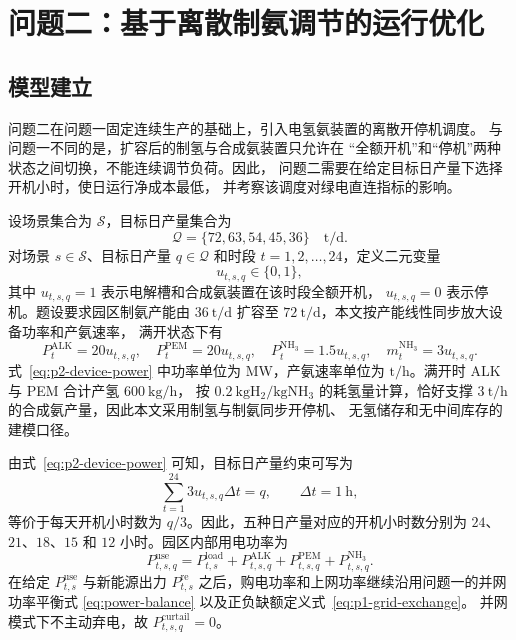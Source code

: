 \section{问题二：基于离散制氨调节的运行优化}

\subsection{模型建立}

问题二在问题一固定连续生产的基础上，引入电氢氨装置的离散开停机调度。
与问题一不同的是，扩容后的制氢与合成氨装置只允许在
``全额开机''和``停机''两种状态之间切换，不能连续调节负荷。因此，
问题二需要在给定目标日产量下选择开机小时，使日运行净成本最低，
并考察该调度对绿电直连指标的影响。

设场景集合为 $\mathcal{S}$，目标日产量集合为
\begin{equation}
  \mathcal{Q}=\{72,63,54,45,36\}\quad \mathrm{t/d}.
  \label{eq:p2-production-set}
\end{equation}
对场景 $s\in\mathcal{S}$、目标日产量 $q\in\mathcal{Q}$ 和时段
$t=1,2,\dots,24$，定义二元变量
\begin{equation}
  u_{t,s,q}\in\{0,1\},
  \label{eq:p2-binary}
\end{equation}
其中 $u_{t,s,q}=1$ 表示电解槽和合成氨装置在该时段全额开机，
$u_{t,s,q}=0$ 表示停机。题设要求园区制氨产能由 $36~\mathrm{t/d}$
扩容至 $72~\mathrm{t/d}$，本文按产能线性同步放大设备功率和产氨速率，
满开状态下有
\begin{equation}
  P_t^{\mathrm{ALK}}=20u_{t,s,q},\quad
  P_t^{\mathrm{PEM}}=20u_{t,s,q},\quad
  P_t^{\mathrm{NH_3}}=1.5u_{t,s,q},\quad
  m_t^{\mathrm{NH_3}}=3u_{t,s,q}.
  \label{eq:p2-device-power}
\end{equation}
式~\eqref{eq:p2-device-power} 中功率单位为 MW，产氨速率单位为
$\mathrm{t/h}$。满开时 ALK 与 PEM 合计产氢 $600~\mathrm{kg/h}$，
按 $0.2~\mathrm{kgH_2/kgNH_3}$ 的耗氢量计算，恰好支撑
$3~\mathrm{t/h}$ 的合成氨产量，因此本文采用制氢与制氨同步开停机、
无氢储存和无中间库存的建模口径。

由式~\eqref{eq:p2-device-power} 可知，目标日产量约束可写为
\begin{equation}
  \sum_{t=1}^{24} 3u_{t,s,q}\Delta t=q,
  \qquad \Delta t=1~\mathrm{h},
  \label{eq:p2-production-constraint}
\end{equation}
等价于每天开机小时数为 $q/3$。因此，五种日产量对应的开机小时数分别为
$24$、$21$、$18$、$15$ 和 $12$ 小时。园区内部用电功率为
\begin{equation}
  P_{t,s,q}^{\mathrm{use}}
  =P_{t,s}^{\mathrm{load}}
  +P_{t,s,q}^{\mathrm{ALK}}
  +P_{t,s,q}^{\mathrm{PEM}}
  +P_{t,s,q}^{\mathrm{NH_3}}.
  \label{eq:p2-use-power}
\end{equation}
在给定 $P_{t,s}^{\mathrm{use}}$ 与新能源出力 $P_{t,s}^{\mathrm{re}}$
之后，购电功率和上网功率继续沿用问题一的并网功率平衡式
\eqref{eq:power-balance} 以及正负缺额定义式~\eqref{eq:p1-grid-exchange}。
并网模式下不主动弃电，故 $P_{t,s,q}^{\mathrm{curtail}}=0$。

